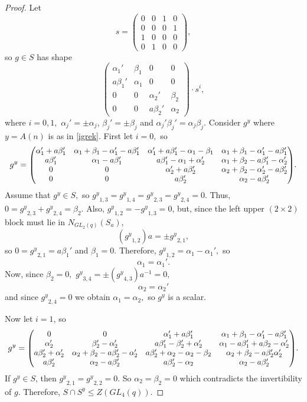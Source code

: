 \begin{proof}

Let $$s=
\begin{pmatrix}
0 & 0& 1 & 0\\
0 & 0& 0 & 1\\
1 & 0& 0 & 0\\
0 & 1& 0 & 0
\end{pmatrix},
$$  
so  $g \in S$ has shape 
$$
\begin{pmatrix}
\alpha_1' & \beta_1& 0 & 0\\
a \beta_1' &  \alpha_1 & 0 & 0 \\
0 & 0& \alpha_2' & \beta_2\\
0 & 0& a \beta_2' & \alpha_2
\end{pmatrix} \cdot s^i,
$$
where $i =0,1,$ $\alpha_j' = \pm \alpha_j$, $\beta_j' = \pm \beta_j$ and $\alpha_j'\beta_j' = \alpha_j \beta_j.$ Consider $g^y$ where $y=A(n)$ is as in \eqref{igrek}. First let $i=0,$ so 
$$g^y = \Scale[0.95]{
\begin{pmatrix}
\alpha_1' +a \beta_1' &\alpha_1+ \beta_1 - \alpha_1' -a\beta_1' & \alpha_1' +a\beta_1'- \alpha_1 - \beta_1 & \alpha_1 + \beta_1 -\alpha_1' -a\beta_1'\\
a \beta_1' &  \alpha_1 -a\beta_1' & a\beta_1' - \alpha_1 + \alpha_2' & \alpha_1 + \beta_2 -a\beta_1' - \alpha_2' \\
0 & 0& \alpha_2' +a\beta_2' & \alpha_2+\beta_2-\alpha_2' -a\beta_2'\\
0 & 0& a \beta_2' & \alpha_2 - a\beta_2'
\end{pmatrix}}.
$$ 
Assume that $g^y \in S,$ so ${g^y}_{1,3}={g^y}_{1,4}={g^y}_{2,3}={g^y}_{2,4}=0.$ Thus, $0={g^y}_{2,3}+{g^y}_{2,4}=\beta_2.$ Also, ${g^y}_{1,2}= - {g^y}_{1,3} = 0$, but, since the left upper $(2 \times 2)$ block must lie in $N_{GL_2(q)}(S_a)$, 
$$({g^y}_{1,2})a = \pm {g^y}_{2,1},$$
so $0 ={g^y}_{2,1} = a\beta_1'$ and $\beta_1=0.$ Therefore, ${g^y}_{1,2}= \alpha_1 -\alpha_1',$ so
$$\alpha_1 =\alpha_1'.$$ Now, since $\beta_2=0,$ ${g^y}_{3,4} = \pm ({g^y}_{4,3}) a^{-1}=0,$  
$$\alpha_2=\alpha_2'$$
and since ${g^y}_{2,4}=0$ we obtain $\alpha_1=\alpha_2,$ so $g^y$ is a scalar.  

Now let $i=1$, so 
$$g^y = \Scale[0.95]{
\begin{pmatrix}
0 & 0 & \alpha_1' + a\beta_1'& \alpha_1 +\beta_1 - \alpha_1' - a\beta_1'\\
\alpha_2' &  \beta_2'-\alpha_2' & a\beta_1' - \beta_2' + \alpha_2' & \alpha_1 - a\beta_1' +a\beta_2 - \alpha_2' \\
a \beta_2' + \alpha_2' & \alpha_2 + \beta_2 -a\beta_2' -\alpha_2'& a\beta_2' + \alpha_2 - \alpha_2 -\beta_2 & \alpha_2+ \beta_2 - a\beta_2' \alpha_2'\\
a\beta_2' & \alpha_2 -a \beta_2'& a\beta_2' - \alpha_2 & \alpha_2 - a\beta_2'
\end{pmatrix}}.
$$ 
If $g^y \in  S$, then ${g^y}_{2,1}={g^y}_{2,2}=0.$ So $\alpha_2 = \beta_2= 0$ which  contradicts the invertibility of $g.$
Therefore, $S \cap S^y  \le Z(GL_4(q)).$ 


\end{proof}
